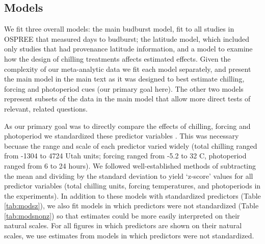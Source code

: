 \documentclass{article}
\begin{document}
\subsection*{Models}

\par We fit three overall models: the main budburst model, fit to all studies in OSPREE that measured days to budburst; the latitude model, which included only studies that had provenance latitude information, and a model to examine how the design of chilling treatments affects estimated effects. Given the complexity of our meta-analytic data we fit each model separately, and present the main model in the main text as it was designed to best estimate chilling, forcing and photoperiod cues (our primary goal here). The other two models represent subsets of the data in the main model that allow more direct tests of relevant, related questions. 

\par As our primary goal was to directly compare the effects of chilling, forcing and photoperiod we standardized these predictor variables \citep{gelman2006}. This was necessary becuase the range and scale of each predictor varied widely (total chilling ranged from -1304 to 4724 Utah units; forcing ranged from -5.2 to 32 \degree C, photoperiod ranged from 6 to 24 hours). We followed well-established methods of subtracting the mean and dividing by the standard deviation \citep{gelman2006} to yield `z-score' values for all predictor variables (total chilling units, forcing temperatures, and photoperiods in the experiments).  In addition to these models with standardized predictors (Table \ref{tab:modsz}), we also fit models in which predictors were not standardized (Table \ref{tab:modsnonz}) so that estimates could be more easily interpreted on their natural scales. For all figures in which predictors are shown on their natural scales, we use estimates from models in which predictors were not standardized. 
\end{document}
